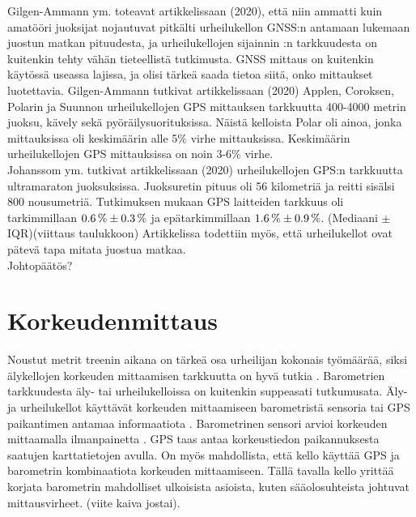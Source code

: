 \documentclass[utf8,bachelor,finnish]{bachelor}
\begin{document}
  Gilgen-Ammann ym. toteavat artikkelissaan (2020), että niin ammatti kuin amatööri juoksijat nojautuvat pitkälti urheilukellon GNSS:n antamaan lukemaan juostun matkan pituudesta,
    ja urheilukellojen sijainnin :n tarkkuudesta on kuitenkin tehty vähän tieteellistä tutkimusta. GNSS mittaus on kuitenkin käytössä useassa lajissa, ja olisi tärkeä saada tietoa siitä,
     onko mittaukset luotettavia. Gilgen-Ammann tutkivat artikkelissaan (2020) Applen, Coroksen, Polarin ja Suunnon urheilukellojen GPS mittauksen tarkkuutta 400-4000 metrin juoksu,
      kävely sekä pyöräilysuorituksissa. Näistä kelloista Polar oli ainoa, jonka mittauksissa oli keskimäärin alle 5\% virhe mittauksissa.
       Keskimäärin urheilukellojen GPS mittauksissa on noin 3-6\% virhe. \parencite{gilgen-ammann_accuracy_2020} \\
    
  Johanssom ym. tutkivat artikkelissaan (2020) urheilukellojen GPS:n tarkkuutta ultramaraton juoksuksissa. Juoksuretin pituus oli 56 kilometriä ja reitti sisälsi 800 nousumetriä.
   Tutkimuksen mukaan GPS laitteiden tarkkuus oli tarkimmillaan $\SI{0.6 \pm 0.3}{\percent}$ ja epätarkimmillaan $ \SI{1.6 \pm 0.9}{\percent} $. (Mediaani $\pm$ IQR)(viittaus taulukkoon)
    Artikkelissa todettiin myös, että urheilukellot ovat pätevä tapa mitata juostua matkaa. \parencite{johansson_accuracy_2020}\\

  Johtopäätös?
  \section{Korkeudenmittaus}
    Noustut metrit treenin aikana on tärkeä osa urheilijan kokonais työmäärää, siksi älykellojen korkeuden mittaamisen tarkkuutta on hyvä tutkia \parencite{ammann_accuracy_2016}.
     Barometrien tarkkuudesta äly- tai urheilukelloissa on kuitenkin suppeasati tutkumusata. Äly- ja urheilukellot käyttävät korkeuden mittaamiseen barometristä sensoria tai GPS
      paikantimen antamaa informaatiota \parencite{ammann_accuracy_2016}. Barometrinen sensori arvioi korkeuden mittaamalla ilmanpainetta \parencite{aroganam2019review}.
       GPS taas antaa korkeustiedon paikannuksesta saatujen karttatietojen avulla. On myös mahdollista, että kello käyttää GPS ja barometrin kombinaatiota
        korkeuden mittaamiseen. Tällä tavalla kello yrittää korjata barometrin mahdolliset ulkoisista asioista, kuten sääolosuhteista johtuvat mittausvirheet. (viite kaiva jostai).\\
        
\end{document}

